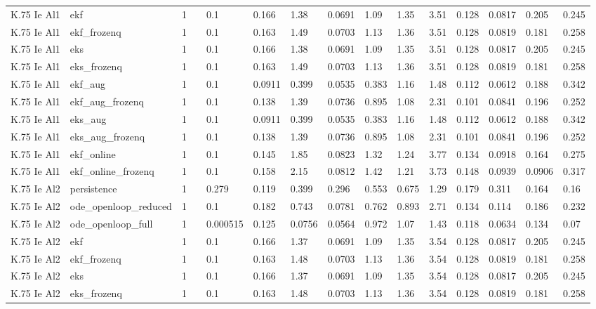 \begin{table}[t]
\begin{tabular}{lllllllllllllll}
K.75 Ie Al1 & ekf & 1 &  & 0.1 & 0.166 & 1.38 & 0.0691 & 1.09 & 1.35 & 3.51 & 0.128 & 0.0817 & 0.205 & 0.245 \\
K.75 Ie Al1 & ekf\_frozenq & 1 &  & 0.1 & 0.163 & 1.49 & 0.0703 & 1.13 & 1.36 & 3.51 & 0.128 & 0.0819 & 0.181 & 0.258 \\
K.75 Ie Al1 & eks & 1 &  & 0.1 & 0.166 & 1.38 & 0.0691 & 1.09 & 1.35 & 3.51 & 0.128 & 0.0817 & 0.205 & 0.245 \\
K.75 Ie Al1 & eks\_frozenq & 1 &  & 0.1 & 0.163 & 1.49 & 0.0703 & 1.13 & 1.36 & 3.51 & 0.128 & 0.0819 & 0.181 & 0.258 \\
K.75 Ie Al1 & ekf\_aug & 1 &  & 0.1 & 0.0911 & 0.399 & 0.0535 & 0.383 & 1.16 & 1.48 & 0.112 & 0.0612 & 0.188 & 0.342 \\
K.75 Ie Al1 & ekf\_aug\_frozenq & 1 &  & 0.1 & 0.138 & 1.39 & 0.0736 & 0.895 & 1.08 & 2.31 & 0.101 & 0.0841 & 0.196 & 0.252 \\
K.75 Ie Al1 & eks\_aug & 1 &  & 0.1 & 0.0911 & 0.399 & 0.0535 & 0.383 & 1.16 & 1.48 & 0.112 & 0.0612 & 0.188 & 0.342 \\
K.75 Ie Al1 & eks\_aug\_frozenq & 1 &  & 0.1 & 0.138 & 1.39 & 0.0736 & 0.895 & 1.08 & 2.31 & 0.101 & 0.0841 & 0.196 & 0.252 \\
K.75 Ie Al1 & ekf\_online & 1 &  & 0.1 & 0.145 & 1.85 & 0.0823 & 1.32 & 1.24 & 3.77 & 0.134 & 0.0918 & 0.164 & 0.275 \\
K.75 Ie Al1 & ekf\_online\_frozenq & 1 &  & 0.1 & 0.158 & 2.15 & 0.0812 & 1.42 & 1.21 & 3.73 & 0.148 & 0.0939 & 0.0906 & 0.317 \\
K.75 Ie Al2 & persistence & 1 &  & 0.279 & 0.119 & 0.399 & 0.296 & 0.553 & 0.675 & 1.29 & 0.179 & 0.311 & 0.164 & 0.16 \\
K.75 Ie Al2 & ode\_openloop\_reduced & 1 &  & 0.1 & 0.182 & 0.743 & 0.0781 & 0.762 & 0.893 & 2.71 & 0.134 & 0.114 & 0.186 & 0.232 \\
K.75 Ie Al2 & ode\_openloop\_full & 1 &  & 0.000515 & 0.125 & 0.0756 & 0.0564 & 0.972 & 1.07 & 1.43 & 0.118 & 0.0634 & 0.134 & 0.07 \\
K.75 Ie Al2 & ekf & 1 &  & 0.1 & 0.166 & 1.37 & 0.0691 & 1.09 & 1.35 & 3.54 & 0.128 & 0.0817 & 0.205 & 0.245 \\
K.75 Ie Al2 & ekf\_frozenq & 1 &  & 0.1 & 0.163 & 1.48 & 0.0703 & 1.13 & 1.36 & 3.54 & 0.128 & 0.0819 & 0.181 & 0.258 \\
K.75 Ie Al2 & eks & 1 &  & 0.1 & 0.166 & 1.37 & 0.0691 & 1.09 & 1.35 & 3.54 & 0.128 & 0.0817 & 0.205 & 0.245 \\
K.75 Ie Al2 & eks\_frozenq & 1 &  & 0.1 & 0.163 & 1.48 & 0.0703 & 1.13 & 1.36 & 3.54 & 0.128 & 0.0819 & 0.181 & 0.258 \\

\end{tabular}
\end{table}
